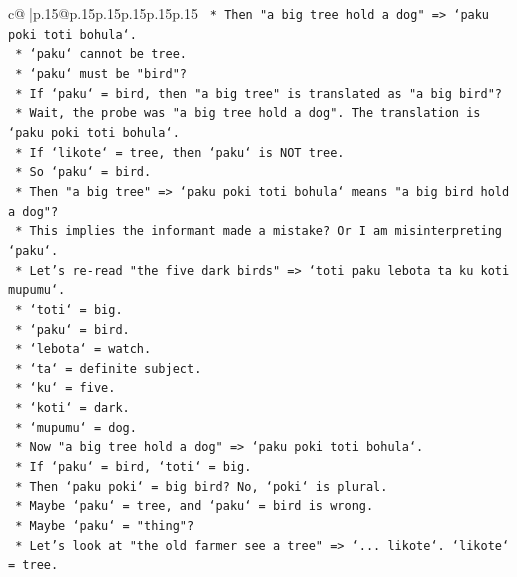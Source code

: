 \documentclass{article}
\begin{document}
{\begin{supertabular}{c@{$\;$}|p{.15\linewidth}@{}p{.15\linewidth}p{.15\linewidth}p{.15\linewidth}p{.15\linewidth}p{.15\linewidth}}
{{{\texttt{                *   Then "a big tree hold a dog" => `paku poki toti bohula`.} \\
\texttt{                    *   `paku` cannot be tree.} \\
\texttt{                    *   `paku` must be "bird"?} \\
\texttt{                    *   If `paku` = bird, then "a big tree" is translated as "a big bird"?} \\
\texttt{                    *   Wait, the probe was "a big tree hold a dog". The translation is `paku poki toti bohula`.} \\
\texttt{                    *   If `likote` = tree, then `paku` is NOT tree.} \\
\texttt{                    *   So `paku` = bird.} \\
\texttt{                    *   Then "a big tree" => `paku poki toti bohula` means "a big bird hold a dog"?} \\
\texttt{                    *   This implies the informant made a mistake? Or I am misinterpreting `paku`.} \\
\texttt{                    *   Let's re{-}read "the five dark birds" => `toti paku lebota ta ku koti mupumu`.} \\
\texttt{                        *   `toti` = big.} \\
\texttt{                        *   `paku` = bird.} \\
\texttt{                        *   `lebota` = watch.} \\
\texttt{                        *   `ta` = definite subject.} \\
\texttt{                        *   `ku` = five.} \\
\texttt{                        *   `koti` = dark.} \\
\texttt{                        *   `mupumu` = dog.} \\
\texttt{                    *   Now "a big tree hold a dog" => `paku poki toti bohula`.} \\
\texttt{                        *   If `paku` = bird, `toti` = big.} \\
\texttt{                        *   Then `paku poki` = big bird? No, `poki` is plural.} \\
\texttt{                        *   Maybe `paku` = tree, and `paku` = bird is wrong.} \\
\texttt{                        *   Maybe `paku` = "thing"?} \\
\texttt{                        *   Let's look at "the old farmer see a tree" => `... likote`. `likote` = tree.} \\
}}}
\end{supertabular}}
\end{document}
